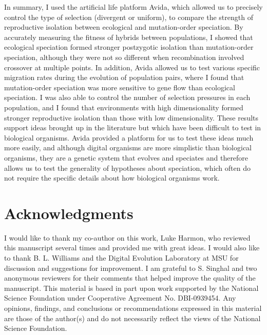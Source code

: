 \begin{doublespace}
In summary, I used the artificial life platform Avida, which allowed us to
precisely control the type of selection (divergent or uniform), to compare the
strength of reproductive isolation between ecological and mutation-order
speciation.
%
By accurately measuring the fitness of hybrids between populations, I showed
that ecological speciation formed stronger postzygotic isolation than
mutation-order speciation, although they were not so different when
recombination involved crossover at multiple points.
%
In addition, Avida allowed us to test various specific migration rates during
the evolution of population pairs, where I found that mutation-order
speciation was more sensitive to gene flow than ecological speciation.
%
I was also able to control the number of selection pressures in each
population, and I found that environments with high dimensionality formed
stronger reproductive isolation than those with low dimensionality.
%
These results support ideas brought up in the literature but which have been
difficult to test in biological organisms.
%
Avida provided a platform for us to test these ideas much more easily, and
although digital organisms are more simplistic than biological organisms, they
are a genetic system that evolves and speciates and therefore allows us to test
the generality of hypotheses about speciation, which often do not require the
specific details about how biological organisms work.



\section*{Acknowledgments}

I would like to thank my co-author on this work, Luke Harmon,
who reviewed this manuscript several times and provided me with great ideas.
%
I would also like to thank B. L. Williams
and the Digital Evolution Laboratory at MSU
for discussion and suggestions for improvement.
%
I am grateful to S. Singhal and two anonymous reviewers for their comments
that helped improve the quality of the manuscript.
%
This material is based in part upon work supported by
the National Science Foundation under Cooperative Agreement No. DBI-0939454.
%
Any opinions, findings, and conclusions or recommendations
expressed in this material are those of the author(s)
and do not necessarily reflect the views of the National Science Foundation.


\end{doublespace}

